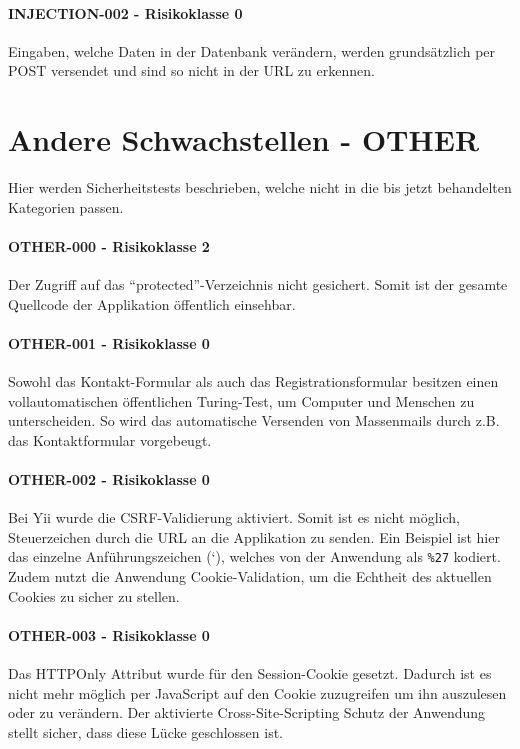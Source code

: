 \clearpage
\paragraph{INJECTION-002 - Risikoklasse 0}
Eingaben, welche Daten in der Datenbank verändern, werden grundsätzlich per POST versendet und sind so nicht in der URL zu erkennen.


\section{Andere Schwachstellen - OTHER}
Hier werden Sicherheitstests beschrieben, welche nicht in die bis jetzt behandelten Kategorien passen. 

\paragraph{OTHER-000 - Risikoklasse 2}
Der Zugriff auf das “protected”-Verzeichnis nicht gesichert. Somit ist der gesamte Quellcode der Applikation öffentlich einsehbar. \\

\clearpage
\paragraph{OTHER-001 - Risikoklasse 0}
Sowohl das Kontakt-Formular als auch das Registrationsformular besitzen einen vollautomatischen öffentlichen Turing-Test, um Computer und Menschen zu unterscheiden. So wird das automatische Versenden von Massenmails durch z.B. das Kontaktformular vorgebeugt.

\paragraph{OTHER-002 - Risikoklasse 0}
Bei Yii wurde die CSRF-Validierung aktiviert. Somit ist es nicht möglich, Steuerzeichen durch die URL an die Applikation zu senden. Ein Beispiel ist hier das einzelne Anführungszeichen (‘), welches von der Anwendung als \texttt{{\%}27} kodiert. Zudem nutzt die Anwendung Cookie-Validation, um die Echtheit des aktuellen Cookies zu sicher zu stellen.

\paragraph{OTHER-003 - Risikoklasse 0}
Das HTTPOnly Attribut wurde für den Session-Cookie gesetzt. Dadurch ist es nicht mehr möglich per JavaScript auf den Cookie zuzugreifen um ihn auszulesen oder zu verändern. Der aktivierte Cross-Site-Scripting Schutz der Anwendung stellt sicher, dass diese Lücke geschlossen ist.



